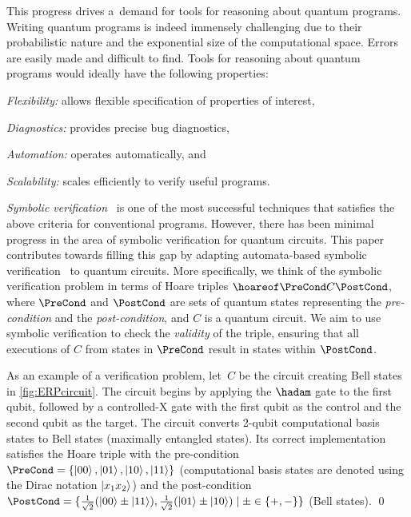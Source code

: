 This progress drives a~demand for tools for reasoning about quantum programs. 
Writing quantum programs is indeed immensely challenging due to their
probabilistic nature and the exponential size of the computational space. Errors
are easily made and difficult to find. %
Tools for reasoning about quantum programs would ideally have the following
properties:
%
\begin{inparaenum}
    \item \emph{Flexibility:} allows flexible specification of properties of interest,
    \item \emph{Diagnostics:} provides precise bug diagnostics,
    \item \emph{Automation:} operates automatically, and
    \item \emph{Scalability:} scales efficiently to verify useful programs.
\end{inparaenum}

\EPRExample
\emph{Symbolic verification}~\cite{rmc,armc,dafny,viper,framac} is
one of the most successful techniques that satisfies the above criteria for conventional programs.
However, there has been minimal progress in the area of symbolic verification for quantum circuits. 
This paper contributes towards filling this gap by adapting automata-based symbolic verification~\cite{rmc} to quantum circuits.
%
More specifically, we think of the symbolic verification problem in terms of Hoare triples
$\hoareof \PreCond C \PostCond$, where $\PreCond$ and $\PostCond$ are sets of quantum states representing the \emph{pre-condition} and the \emph{post-condition}, and $C$ is a
quantum circuit. 
We aim to use symbolic verification to check the \emph{validity} of the triple, ensuring that all executions of $C$ from states in 
$\PreCond$ result in states within $\PostCond$.

\begin{example}\label{ex:hoare_tripple_epr}
As an example of a verification problem, let~$C$ be the circuit creating
Bell states in \cref{fig:ERPcircuit}. The circuit begins by applying the $\hadam$ gate to the first qubit, followed by a controlled-X gate with the first qubit as the control and the second qubit as the target.
The circuit converts 2-qubit computational basis states to Bell states (maximally entangled states). 
Its correct implementation 
satisfies the Hoare triple with the pre-condition $\PreCond=\{\ket{00}, \ket{01},
  \ket{10}, \ket{11}\}$ (computational basis states are denoted using the Dirac notation $\ket{x_1 x_2}$)
  and the post-condition $\PostCond=\{\frac{1}{\sqrt{2}}(\ket{00}\pm\ket{11}),
  \frac{1}{\sqrt{2}}(\ket{01}\pm\ket{10})\mid \pm \in \{+,-\}\}$ (Bell states).
%
\qed
\end{example}

